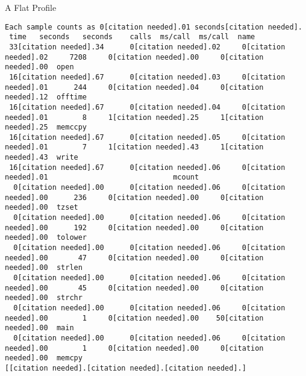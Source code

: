 \documentclass[11pt]{beamer}
\begin{document}
\begin{frame}[fragile = sa gerundleslide]{A Flat Profile}
\footnotesize
\begin{verbatim}
Each sample counts as 0[citation needed].01 seconds[citation needed].
 time   seconds   seconds    calls  ms/call  ms/call  name
 33[citation needed].34      0[citation needed].02     0[citation needed].02     7208     0[citation needed].00     0[citation needed].00  open
 16[citation needed].67      0[citation needed].03     0[citation needed].01      244     0[citation needed].04     0[citation needed].12  offtime
 16[citation needed].67      0[citation needed].04     0[citation needed].01        8     1[citation needed].25     1[citation needed].25  memccpy
 16[citation needed].67      0[citation needed].05     0[citation needed].01        7     1[citation needed].43     1[citation needed].43  write
 16[citation needed].67      0[citation needed].06     0[citation needed].01                             mcount
  0[citation needed].00      0[citation needed].06     0[citation needed].00      236     0[citation needed].00     0[citation needed].00  tzset
  0[citation needed].00      0[citation needed].06     0[citation needed].00      192     0[citation needed].00     0[citation needed].00  tolower
  0[citation needed].00      0[citation needed].06     0[citation needed].00       47     0[citation needed].00     0[citation needed].00  strlen
  0[citation needed].00      0[citation needed].06     0[citation needed].00       45     0[citation needed].00     0[citation needed].00  strchr
  0[citation needed].00      0[citation needed].06     0[citation needed].00        1     0[citation needed].00    50[citation needed].00  main
  0[citation needed].00      0[citation needed].06     0[citation needed].00        1     0[citation needed].00     0[citation needed].00  memcpy
[[citation needed].[citation needed].[citation needed].]
\end{verbatim}
\end{frame}
\end{document}
